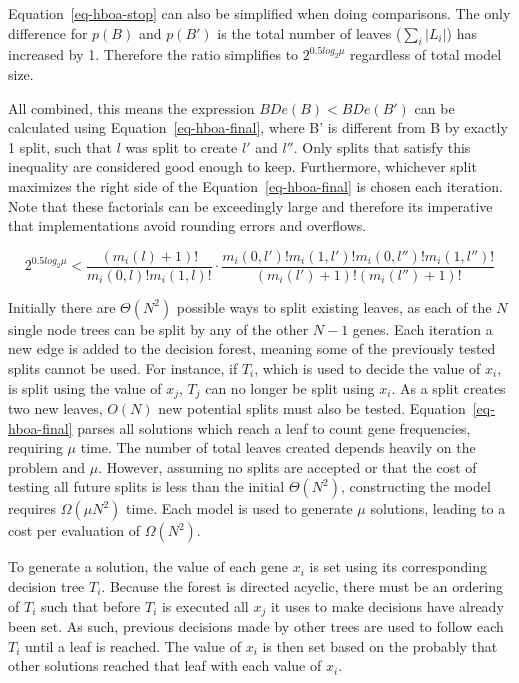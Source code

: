 \documentclass[twoside]{article}
\begin{document}
Equation~\ref{eq-hboa-stop} can also be simplified when doing comparisons. The only difference for $p(B)$ and $p(B')$ is the total
number of leaves ($\sum_i|L_i|$) has increased by 1. Therefore the ratio simplifies to $2^{0.5 log_2\mu}$ regardless of
total model size.

All combined, this means the expression $BDe(B) < BDe(B')$ can be calculated using Equation~\ref{eq-hboa-final},
where B' is different from B by exactly 1 split, such that $l$ was split to create $l'$ and $l''$. Only splits that
satisfy this inequality are considered good enough to keep. Furthermore, whichever split maximizes the right side of the
Equation~\ref{eq-hboa-final} is chosen each iteration. Note that these factorials can be exceedingly large and
therefore its imperative that implementations avoid rounding errors and overflows.

\begin{equation}
  2^{0.5 log_2\mu} < \frac{(m_i(l) + 1)!}{m_i(0, l)!m_i(1,l)!} \cdot
  \frac{m_i(0, l')!m_i(1,l')!m_i(0, l'')!m_i(1,l'')!}{(m_i(l') + 1)!(m_i(l'') + 1)!}
  \label{eq-hboa-final}
\end{equation}

Initially there are $\Theta(N^2)$ possible ways to split existing leaves, as each of the $N$ single node
trees can be split by any of the other $N-1$ genes. Each iteration a new edge is added to the decision
forest, meaning some of the previously tested splits cannot be used. For instance, if $T_i$, which is used
to decide the value of $x_i$, is split using the value of $x_j$, $T_j$ can no longer be split using $x_i$.
As a split creates two new leaves, $O(N)$ new potential splits must also be tested. Equation~\ref{eq-hboa-final}
parses all solutions which reach a leaf to count gene frequencies, requiring $\mu$ time.
The number of total leaves created depends heavily on the problem and $\mu$.
However, assuming no splits are accepted or that the cost of testing all future splits is less than
the initial $\Theta(N^2)$, constructing the model requires $\Omega(\mu N^2)$ time. Each
model is used to generate $\mu$ solutions, leading to a cost per evaluation of $\Omega(N^2)$.

To generate a solution, the value of each gene $x_i$ is set using its corresponding decision tree $T_i$. Because
the forest is directed acyclic, there must be an ordering of $T_i$ such that before $T_i$ is executed all
$x_j$ it uses to make decisions have already been set. As such, previous decisions made by other trees
are used to follow each $T_i$ until a leaf is reached. The value of $x_i$ is then set based on the
probably that other solutions reached that leaf with each value of $x_i$.
\end{document}
